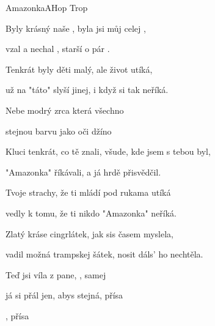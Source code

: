 \setcounter{page}{5}
\begin{song}{Amazonka}{A}{Hop Trop}

\begin{SBVerse}

Byly krásný naše , byla jsi můj celej , 

 vzal a nechal , starší  o pár .

\end{SBVerse}

\begin{SBVerse}

Tenkrát byly děti malý, ale život utíká,

už na "táto" slyší jinej, i když si tak neříká.

\end{SBVerse}

\begin{SBChorus}

Nebe modrý zrca  která všechno 

stejnou barvu jako   oči džíno

\end{SBChorus}

\begin{SBVerse}

Kluci tenkrát, co tě znali, všude, kde jsem s tebou byl,

"Amazonka" říkávali, a já hrdě přisvědčil.

\end{SBVerse}

\begin{SBVerse}

Tvoje strachy, že ti mládí pod rukama utíká

vedly k tomu, že ti nikdo "Amazonka" neříká.

\end{SBVerse}

\begin{SBChorus}

\end{SBChorus}

\begin{SBVerse}

Zlatý kráse cingrlátek, jak sis časem myslela,

vadil možná trampskej šátek, nosit dáls' ho nechtěla.

\end{SBVerse}

\begin{SBChorus}

Teď jsi víla z pane, , samej 

já si přál jen, abys   stejná, přísa

, přísa

\end{SBChorus}

\end{song}

\clearpage
